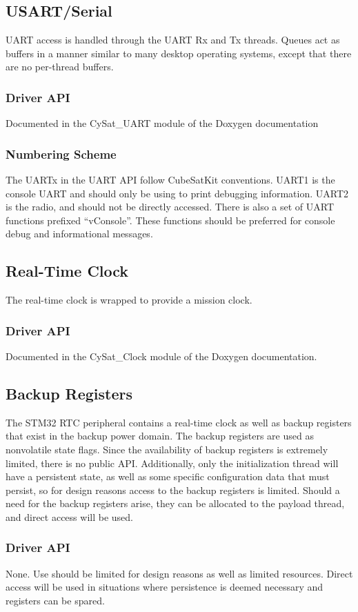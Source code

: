 \documentclass[10pt]{extarticle}
\begin{document}
\subsection{USART/Serial}
UART access is handled through the UART Rx and Tx threads. Queues act as
buffers in a manner similar to many desktop operating systems, except that
there are no per-thread buffers.
\subsubsection{Driver API}
Documented in the CySat\_UART module of the Doxygen documentation
\subsubsection{Numbering Scheme}
The UARTx in the UART API follow CubeSatKit conventions. UART1 is the console
UART and should only be using to print debugging information. UART2 is the radio, and
should not be directly accessed. There is also a set of UART functions prefixed ``vConsole''.
These functions should be preferred for console debug and informational messages.

\subsection{Real-Time Clock}
The real-time
clock is wrapped to provide a mission clock.
\subsubsection{Driver API}
Documented in the CySat\_Clock module of the Doxygen documentation.

\subsection{Backup Registers}
The STM32 RTC peripheral contains a real-time clock as well as 
backup registers that exist in the backup power domain. The backup registers are 
used as nonvolatile state flags. Since the availability of backup registers
is extremely limited, there is no public API. Additionally, only the
initialization thread will have a persistent state, as well as some 
specific configuration data that must persist, so for design reasons
access to the backup registers is limited. Should a need for the backup
registers arise, they can be allocated to the payload thread, and direct
access will be used.
\subsubsection{Driver API}
None. Use should be limited for design reasons as well as limited resources. Direct
access will be used in situations where persistence is deemed necessary and
registers can be spared.
\end{document}
